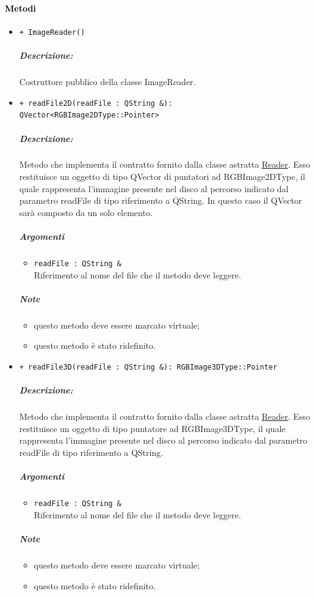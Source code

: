 \paragraph{\textcolor{black}{Metodi}}
	\begin{itemize}
		\item \color{blue}\verb!+ ImageReader()!
		\color{black}
		\subparagraph{Descrizione:} Costruttore pubblico della classe ImageReader.


		\item \color{blue}\verb!+ readFile2D(readFile : QString &): QVector<RGBImage2DType::Pointer>!
		\color{black}
		\subparagraph{Descrizione:} Metodo che implementa il contratto fornito dalla classe astratta \hyperref[spereader]{Reader}. Esso restituisce un oggetto di tipo QVector di puntatori ad  RGBImage2DType, il quale rappresenta l'immagine presente nel disco al percorso indicato dal parametro readFile di tipo riferimento a QString. In questo caso il QVector sarà composto da un solo elemento. 

	\subparagraph{Argomenti}
		\begin{itemize}
			\item \color{RoyalPurple}\verb!readFile : QString &! \\
			\color{black} Riferimento al nome del file che il metodo deve leggere.
		\end{itemize}
\color{black}
	\subparagraph{Note}
		\begin{itemize}
			\item questo metodo deve essere marcato virtuale;
			\item questo metodo è stato ridefinito.
		\end{itemize} 
	\item \color{blue}\verb!+ readFile3D(readFile : QString &): RGBImage3DType::Pointer!
	\color{black}
	\subparagraph{Descrizione:} Metodo che implementa il contratto fornito dalla classe astratta \hyperref[spereader]{Reader}. Esso restituisce un oggetto di tipo puntatore ad  RGBImage3DType, il quale rappresenta l'immagine presente nel disco al percorso indicato dal parametro readFile di tipo riferimento a QString.

	\subparagraph{Argomenti}
		\begin{itemize}
			\item \color{RoyalPurple}\verb!readFile : QString &! \\ 
			\color{black}Riferimento al nome del file che il metodo deve leggere.
		\end{itemize}

	\subparagraph{Note}
		\begin{itemize}
			\item questo metodo deve essere marcato virtuale;
			\item questo metodo è stato ridefinito.
	\end{itemize} 
\end{itemize}
\color{black}
